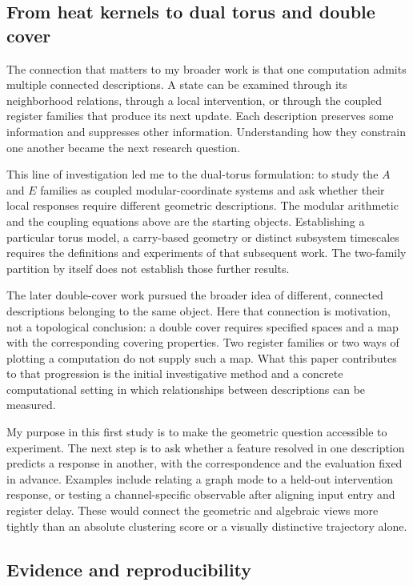 \documentclass[11pt]{article}
\begin{document}
\subsection{From heat kernels to dual torus and double cover}\label{sec:continuity}
The connection that matters to my broader work is that one computation admits multiple connected descriptions. A state can be examined through its neighborhood relations, through a local intervention, or through the coupled register families that produce its next update. Each description preserves some information and suppresses other information. Understanding how they constrain one another became the next research question.

This line of investigation led me to the dual-torus formulation: to study the $A$ and $E$ families as coupled modular-coordinate systems and ask whether their local responses require different geometric descriptions. The modular arithmetic and the coupling equations above are the starting objects. Establishing a particular torus model, a carry-based geometry or distinct subsystem timescales requires the definitions and experiments of that subsequent work. The two-family partition by itself does not establish those further results.

The later double-cover work pursued the broader idea of different, connected descriptions belonging to the same object. Here that connection is motivation, not a topological conclusion: a double cover requires specified spaces and a map with the corresponding covering properties. Two register families or two ways of plotting a computation do not supply such a map. What this paper contributes to that progression is the initial investigative method and a concrete computational setting in which relationships between descriptions can be measured.

My purpose in this first study is to make the geometric question accessible to experiment. The next step is to ask whether a feature resolved in one description predicts a response in another, with the correspondence and the evaluation fixed in advance. Examples include relating a graph mode to a held-out intervention response, or testing a channel-specific observable after aligning input entry and register delay. These would connect the geometric and algebraic views more tightly than an absolute clustering score or a visually distinctive trajectory alone.

\subsection{Evidence and reproducibility}
\end{document}
